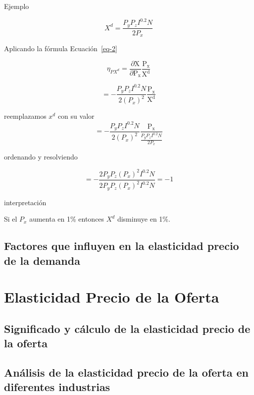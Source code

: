 \documentclass[
  a4paper,
]{article}
\begin{document}
Ejemplo

\[
X^d = \frac{P_y P_z I^{0.2} N}{2 P_x}
\]

Aplicando la fórmula Ecuación~\ref{eq-2}

\[ 
\eta _{PX^d} = \frac{\partial \mathrm{X}}{\partial \mathrm{P_x}} \frac{\mathrm{P_x}}{\mathrm{X^d}} 
\]

\[
= - \frac{P_y P_z I^{0.2} N}{2 (P_x)^2} \frac{\mathrm{P_x}}{\mathrm{X^d} }
\]

reemplazamos \(x^d\) con su valor \[
= - \frac{P_y P_z I^{0.2} N}{2 (P_x)^2} \frac{\mathrm{P_x}}{\frac{P_y P_z I^{0.2} N}{2 P_x} }
\]

ordenando y resolviendo

\[
= - \frac{2 P_y P_z (P_x)^2 I^{0.2} N}{2 P_y P_z (P_x)^2 I^{0.2} N} = -1
\]

interpretación

Si el \(P_x\) aumenta en 1\% entonces \(X^d\) disminuye en 1\%.

\hypertarget{factores-que-influyen-en-la-elasticidad-precio-de-la-demanda}{%
\subsection{Factores que influyen en la elasticidad precio de la
demanda}\label{factores-que-influyen-en-la-elasticidad-precio-de-la-demanda}}

\hypertarget{elasticidad-precio-de-la-oferta}{%
\section{Elasticidad Precio de la
Oferta}\label{elasticidad-precio-de-la-oferta}}

\hypertarget{significado-y-cuxe1lculo-de-la-elasticidad-precio-de-la-oferta}{%
\subsection{Significado y cálculo de la elasticidad precio de la
oferta}\label{significado-y-cuxe1lculo-de-la-elasticidad-precio-de-la-oferta}}

\hypertarget{anuxe1lisis-de-la-elasticidad-precio-de-la-oferta-en-diferentes-industrias}{%
\subsection{Análisis de la elasticidad precio de la oferta en diferentes
industrias}\label{anuxe1lisis-de-la-elasticidad-precio-de-la-oferta-en-diferentes-industrias}}
\end{document}
